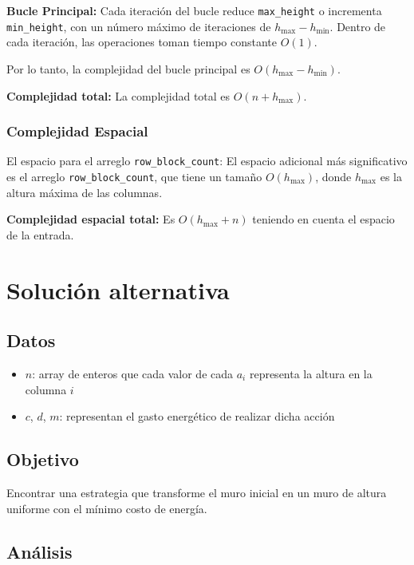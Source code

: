 \documentclass[a4paper,12pt]{article}
\begin{document}
\textbf{Bucle Principal:}
Cada iteración del bucle reduce \texttt{max\_height} o incrementa \texttt{min\_height}, con un número máximo de iteraciones de \(h_{\text{max}} - h_{\text{min}}\). Dentro de cada iteración, las operaciones toman tiempo constante \(O(1)\).

Por lo tanto, la complejidad del bucle principal es \(O(h_{\text{max}} - h_{\text{min}})\).

\textbf{Complejidad total:} La complejidad total es \(O(n + h_{\text{max}})\).

\subsubsection{Complejidad Espacial}

El espacio para el arreglo \texttt{row\_block\_count}:
El espacio adicional más significativo es el arreglo \texttt{row\_block\_count}, que tiene un tamaño \(O(h_{\text{max}})\), donde \(h_{\text{max}}\) es la altura máxima de las columnas.

\textbf{Complejidad espacial total:}
Es \(O(h_{\text{max}} + n)\) teniendo en cuenta el espacio de la entrada.

\section{Solución alternativa}

\subsection{Datos}

\begin{itemize}
	\item \(n\): array de enteros que cada valor de cada $a_{i}$ representa la altura en la columna \(i\)
	\item \(c\), \(d\), \(m\): representan el gasto energético de realizar dicha acción
\end{itemize}

\subsection{Objetivo}
Encontrar una estrategia que transforme el muro inicial en un muro de altura uniforme con el mínimo costo de energía.

\subsection{Análisis}
\end{document}
